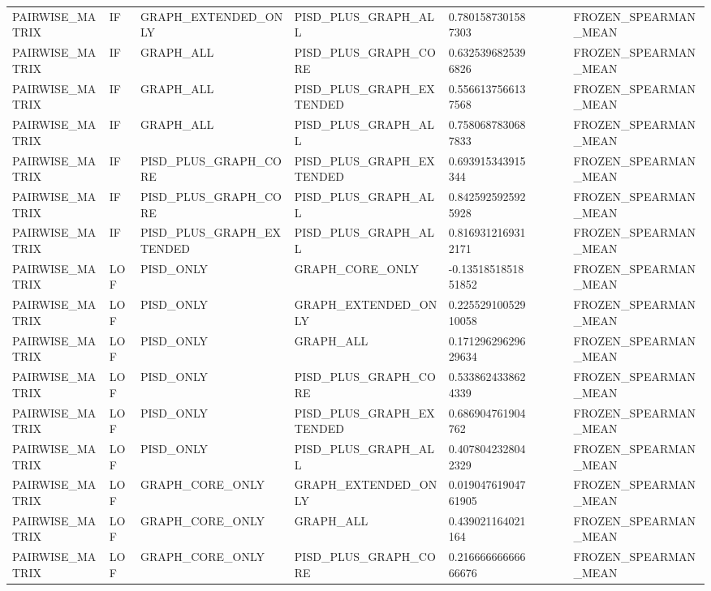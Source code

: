 \begin{longtable}{lllllllll}
PAIRWISE\_MATRIX & IF & GRAPH\_EXTENDED\_ONLY & PISD\_PLUS\_GRAPH\_ALL & 0.7801587301587303 &  &  &  & FROZEN\_SPEARMAN\_MEAN \\
PAIRWISE\_MATRIX & IF & GRAPH\_ALL & PISD\_PLUS\_GRAPH\_CORE & 0.6325396825396826 &  &  &  & FROZEN\_SPEARMAN\_MEAN \\
PAIRWISE\_MATRIX & IF & GRAPH\_ALL & PISD\_PLUS\_GRAPH\_EXTENDED & 0.5566137566137568 &  &  &  & FROZEN\_SPEARMAN\_MEAN \\
PAIRWISE\_MATRIX & IF & GRAPH\_ALL & PISD\_PLUS\_GRAPH\_ALL & 0.7580687830687833 &  &  &  & FROZEN\_SPEARMAN\_MEAN \\
PAIRWISE\_MATRIX & IF & PISD\_PLUS\_GRAPH\_CORE & PISD\_PLUS\_GRAPH\_EXTENDED & 0.693915343915344 &  &  &  & FROZEN\_SPEARMAN\_MEAN \\
PAIRWISE\_MATRIX & IF & PISD\_PLUS\_GRAPH\_CORE & PISD\_PLUS\_GRAPH\_ALL & 0.8425925925925928 &  &  &  & FROZEN\_SPEARMAN\_MEAN \\
PAIRWISE\_MATRIX & IF & PISD\_PLUS\_GRAPH\_EXTENDED & PISD\_PLUS\_GRAPH\_ALL & 0.8169312169312171 &  &  &  & FROZEN\_SPEARMAN\_MEAN \\
PAIRWISE\_MATRIX & LOF & PISD\_ONLY & GRAPH\_CORE\_ONLY & -0.1351851851851852 &  &  &  & FROZEN\_SPEARMAN\_MEAN \\
PAIRWISE\_MATRIX & LOF & PISD\_ONLY & GRAPH\_EXTENDED\_ONLY & 0.22552910052910058 &  &  &  & FROZEN\_SPEARMAN\_MEAN \\
PAIRWISE\_MATRIX & LOF & PISD\_ONLY & GRAPH\_ALL & 0.17129629629629634 &  &  &  & FROZEN\_SPEARMAN\_MEAN \\
PAIRWISE\_MATRIX & LOF & PISD\_ONLY & PISD\_PLUS\_GRAPH\_CORE & 0.5338624338624339 &  &  &  & FROZEN\_SPEARMAN\_MEAN \\
PAIRWISE\_MATRIX & LOF & PISD\_ONLY & PISD\_PLUS\_GRAPH\_EXTENDED & 0.686904761904762 &  &  &  & FROZEN\_SPEARMAN\_MEAN \\
PAIRWISE\_MATRIX & LOF & PISD\_ONLY & PISD\_PLUS\_GRAPH\_ALL & 0.4078042328042329 &  &  &  & FROZEN\_SPEARMAN\_MEAN \\
PAIRWISE\_MATRIX & LOF & GRAPH\_CORE\_ONLY & GRAPH\_EXTENDED\_ONLY & 0.01904761904761905 &  &  &  & FROZEN\_SPEARMAN\_MEAN \\
PAIRWISE\_MATRIX & LOF & GRAPH\_CORE\_ONLY & GRAPH\_ALL & 0.439021164021164 &  &  &  & FROZEN\_SPEARMAN\_MEAN \\
PAIRWISE\_MATRIX & LOF & GRAPH\_CORE\_ONLY & PISD\_PLUS\_GRAPH\_CORE & 0.21666666666666676 &  &  &  & FROZEN\_SPEARMAN\_MEAN \\

\end{longtable}
